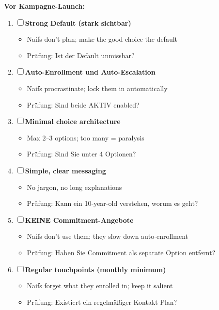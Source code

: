 \begin{tcolorbox}[colback=blue!5!white, colframe=blue!75!black, title=\textbf{Deployment Checklist: Naif}]

\textbf{Vor Kampagne-Launch:}
\begin{enumerate}[label=\textbf{NF-\arabic*}]
\item ☐ \textbf{Strong Default (stark sichtbar)}
  \begin{itemize}[nosep]
  \item Naifs don't plan; make the good choice the default
  \item Prüfung: Ist der Default unmissbar?
  \end{itemize}

\item ☐ \textbf{Auto-Enrollment und Auto-Escalation}
  \begin{itemize}[nosep]
  \item Naifs procrastinate; lock them in automatically
  \item Prüfung: Sind beide AKTIV enabled?
  \end{itemize}

\item ☐ \textbf{Minimal choice architecture}
  \begin{itemize}[nosep]
  \item Max 2--3 options; too many = paralysis
  \item Prüfung: Sind Sie unter 4 Optionen?
  \end{itemize}

\item ☐ \textbf{Simple, clear messaging}
  \begin{itemize}[nosep]
  \item No jargon, no long explanations
  \item Prüfung: Kann ein 10-year-old verstehen, worum es geht?
  \end{itemize}

\item ☐ \textbf{KEINE Commitment-Angebote}
  \begin{itemize}[nosep]
  \item Naifs don't use them; they slow down auto-enrollment
  \item Prüfung: Haben Sie Commitment als separate Option entfernt?
  \end{itemize}

\item ☐ \textbf{Regular touchpoints (monthly minimum)}
  \begin{itemize}[nosep]
  \item Naifs forget what they enrolled in; keep it salient
  \item Prüfung: Existiert ein regelmäßiger Kontakt-Plan?
  \end{itemize}
\end{enumerate}

\end{tcolorbox}

